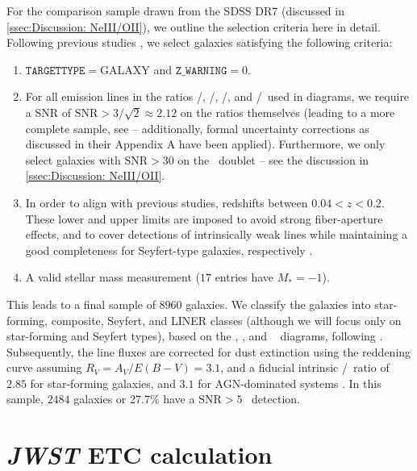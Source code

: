 For the comparison sample drawn from the SDSS DR7 (discussed in \cref{ssec:Discussion: NeIII/OII}), we outline the selection criteria here in detail. Following previous studies \citep[e.g.][]{2006MNRAS.372..961K, 2014ApJ...788...88J, 2016MNRAS.456.3354F}, we select galaxies satisfying the following criteria:
\begin{enumerate}[label=(\roman*)]
    \item $\mathtt{TARGETTYPE} = \mathrm{GALAXY}$ and $\mathtt{Z\_WARNING} = 0$.
    \item For all emission lines in the ratios \OIIIf/\Hb, \NII/\Ha, \SII/\Ha, and \OI/\Ha\ used in  diagrams, we require a SNR of $\text{SNR} > 3/\sqrt{2} \approx 2.12$ on the ratios themselves (leading to a more complete sample, see \citet{2014ApJ...788...88J} -- additionally, formal uncertainty corrections as discussed in their Appendix A have been applied). Furthermore, we only select galaxies with $\text{SNR} > 30$ on the \OII\ doublet -- see the discussion in \cref{ssec:Discussion: NeIII/OII}.
    \item In order to align with previous studies, redshifts between $0.04 < z < 0.2$. These lower and upper limits are imposed to avoid strong fiber-aperture effects, and to cover detections of intrinsically weak lines while maintaining a good completeness for Seyfert-type galaxies, respectively \citep[e.g.][]{2014ApJ...788...88J}.
    \item A valid stellar mass measurement ($17$ entries have $M_* = -1$).
\end{enumerate}
This leads to a final sample of $8960$ galaxies. We classify the galaxies into star-forming, composite, Seyfert, and LINER classes (although we will focus only on star-forming and Seyfert types), based on the \NII, \SII, and \OI\  diagrams, following \citet{2006MNRAS.372..961K}. Subsequently, the line fluxes are corrected for dust extinction using the \citet{1989ApJ...345..245C} reddening curve assuming $R_V = A_V/E(B-V) = 3.1$, and a fiducial intrinsic \Ha/\Hb\ ratio of $2.85$ for star-forming galaxies, and $3.1$ for AGN-dominated systems \citep[for case-B recombination at $T = 10^4 \, \mathrm{K}$ and $n_e \sim 10^2$-$10^4 \, \mathrm{cm^{-3}}$, see][]{2006MNRAS.372..961K}. In this sample, $2484$ galaxies or 27.7\% have a $\text{SNR} > 5$ \NeIII\ detection.

\section{\textit{JWST} ETC calculation}
\label{ap:JWST ETC calculation}

